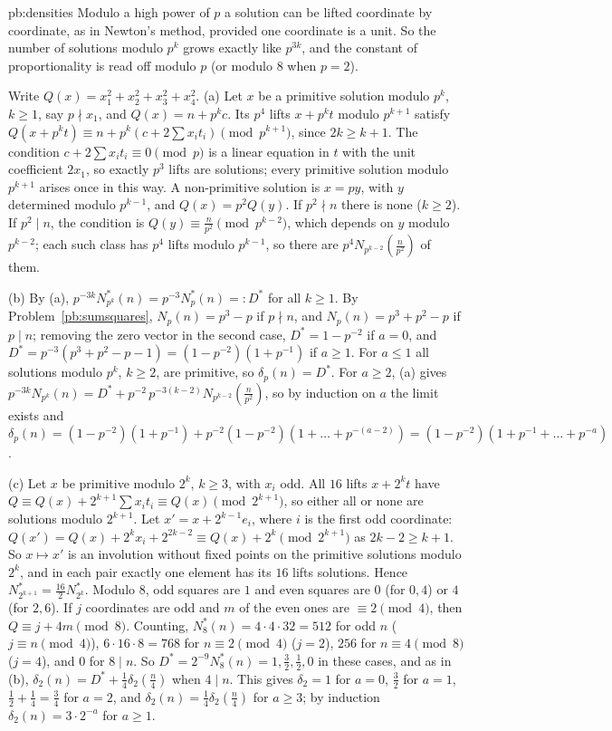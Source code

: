 \begin{solution}{pb:densities}
\idea Modulo a high power of $p$ a solution can be lifted coordinate by coordinate, as in Newton's method, provided one coordinate is a unit. So the number of solutions
modulo $p^k$ grows exactly like $p^{3k}$, and the constant of proportionality is read off modulo $p$ (or modulo $8$ when $p=2$).

\writeup Write $Q(x)=x_1^2+x_2^2+x_3^2+x_4^2$. (a) Let $x$ be a primitive solution modulo $p^k$, $k\ge1$, say $p\nmid x_1$, and $Q(x)=n+p^kc$. Its $p^4$ lifts
$x+p^kt$ modulo $p^{k+1}$ satisfy $Q(x+p^kt)\equiv n+p^k(c+2\sum x_it_i)\pmod{p^{k+1}}$, since $2k\ge k+1$. The condition $c+2\sum x_it_i\equiv0\pmod p$ is a linear equation in $t$
with the unit coefficient $2x_1$, so exactly $p^3$ lifts are solutions; every primitive solution modulo $p^{k+1}$ arises once in this way. A non-primitive solution is $x=py$,
with $y$ determined modulo $p^{k-1}$, and $Q(x)=p^2Q(y)$. If $p^2\nmid n$ there is none ($k\ge2$). If $p^2\mid n$, the condition is $Q(y)\equiv\frac n{p^2}\pmod{p^{k-2}}$, which
depends on $y$ modulo $p^{k-2}$; each such class has $p^4$ lifts modulo $p^{k-1}$, so there are $p^4N_{p^{k-2}}(\frac n{p^2})$ of them.

(b) By (a), $p^{-3k}N^*_{p^k}(n)=p^{-3}N^*_p(n)=:D^*$ for all $k\ge1$. By Problem~\ref{pb:sumsquares}, $N_p(n)=p^3-p$ if $p\nmid n$, and $N_p(n)=p^3+p^2-p$ if $p\mid n$; removing the
zero vector in the second case, $D^*=1-p^{-2}$ if $a=0$, and $D^*=p^{-3}(p^3+p^2-p-1)=(1-p^{-2})(1+p^{-1})$ if $a\ge1$. For $a\le1$ all solutions modulo $p^k$, $k\ge2$, are
primitive, so $\delta_p(n)=D^*$. For $a\ge2$, (a) gives $p^{-3k}N_{p^k}(n)=D^*+p^{-2}\,p^{-3(k-2)}N_{p^{k-2}}(\frac n{p^2})$, so by induction on $a$ the limit exists and
$\delta_p(n)=(1-p^{-2})(1+p^{-1})+p^{-2}(1-p^{-2})(1+\dots+p^{-(a-2)})=(1-p^{-2})(1+p^{-1}+\dots+p^{-a})$.

(c) Let $x$ be primitive modulo $2^k$, $k\ge3$, with $x_i$ odd. All $16$ lifts $x+2^kt$ have $Q\equiv Q(x)+2^{k+1}\sum x_it_i\equiv Q(x)\pmod{2^{k+1}}$, so either all or none are
solutions modulo $2^{k+1}$. Let $x'=x+2^{k-1}e_i$, where $i$ is the first odd coordinate: $Q(x')=Q(x)+2^kx_i+2^{2k-2}\equiv Q(x)+2^k\pmod{2^{k+1}}$ as $2k-2\ge k+1$. So
$x\mapsto x'$ is an involution without fixed points on the primitive solutions modulo $2^k$, and in each pair exactly one element has its $16$ lifts solutions. Hence
$N^*_{2^{k+1}}=\frac{16}2N^*_{2^k}$. Modulo $8$, odd squares are $1$ and even squares are $0$ (for $0,4$) or $4$ (for $2,6$). If $j$ coordinates are odd and $m$ of the even ones are
$\equiv2\pmod4$, then $Q\equiv j+4m\pmod8$. Counting, $N^*_8(n)=4\cdot4\cdot32=512$ for odd $n$ ($j\equiv n\pmod4$), $6\cdot16\cdot8=768$ for $n\equiv2\pmod4$ ($j=2$), $256$ for
$n\equiv4\pmod8$ ($j=4$), and $0$ for $8\mid n$. So $D^*=2^{-9}N^*_8(n)=1,\frac32,\frac12,0$ in these cases, and as in (b), $\delta_2(n)=D^*+\frac14\delta_2(\frac n4)$ when $4\mid n$. This
gives $\delta_2=1$ for $a=0$, $\frac32$ for $a=1$, $\frac12+\frac14=\frac34$ for $a=2$, and $\delta_2(n)=\frac14\delta_2(\frac n4)$ for $a\ge3$; by induction $\delta_2(n)=3\cdot2^{-a}$ for $a\ge1$.


\end{solution}
